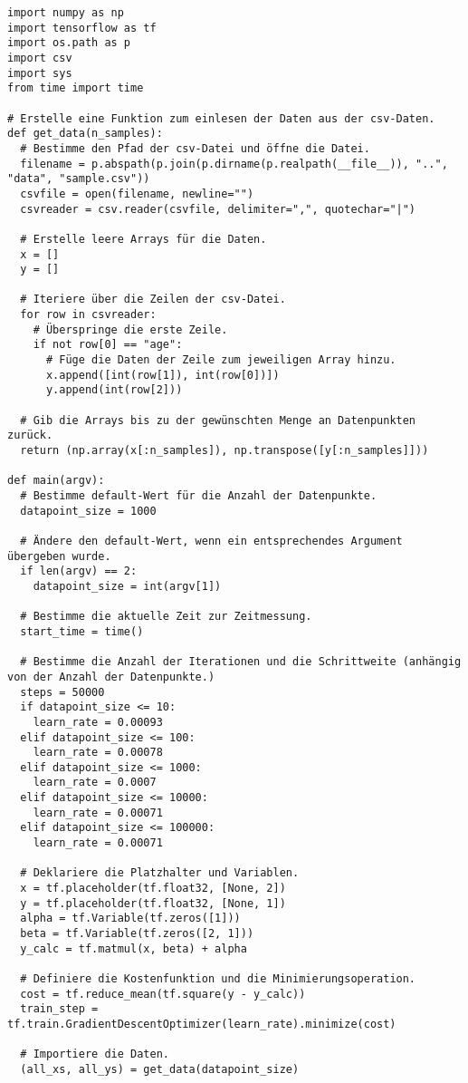 \begin{verbatim}
import numpy as np
import tensorflow as tf
import os.path as p
import csv
import sys
from time import time

# Erstelle eine Funktion zum einlesen der Daten aus der csv-Daten.
def get_data(n_samples):
  # Bestimme den Pfad der csv-Datei und öffne die Datei.
  filename = p.abspath(p.join(p.dirname(p.realpath(__file__)), "..", "data", "sample.csv"))
  csvfile = open(filename, newline="")
  csvreader = csv.reader(csvfile, delimiter=",", quotechar="|")

  # Erstelle leere Arrays für die Daten.
  x = []
  y = []

  # Iteriere über die Zeilen der csv-Datei.
  for row in csvreader:
    # Überspringe die erste Zeile.
    if not row[0] == "age":
      # Füge die Daten der Zeile zum jeweiligen Array hinzu.
      x.append([int(row[1]), int(row[0])])
      y.append(int(row[2]))

  # Gib die Arrays bis zu der gewünschten Menge an Datenpunkten zurück.
  return (np.array(x[:n_samples]), np.transpose([y[:n_samples]]))

def main(argv):
  # Bestimme default-Wert für die Anzahl der Datenpunkte.
  datapoint_size = 1000

  # Ändere den default-Wert, wenn ein entsprechendes Argument übergeben wurde.
  if len(argv) == 2:
    datapoint_size = int(argv[1])

  # Bestimme die aktuelle Zeit zur Zeitmessung.
  start_time = time()

  # Bestimme die Anzahl der Iterationen und die Schrittweite (anhängig von der Anzahl der Datenpunkte.)
  steps = 50000
  if datapoint_size <= 10:
    learn_rate = 0.00093
  elif datapoint_size <= 100:
    learn_rate = 0.00078
  elif datapoint_size <= 1000:
    learn_rate = 0.0007
  elif datapoint_size <= 10000:
    learn_rate = 0.00071
  elif datapoint_size <= 100000:
    learn_rate = 0.00071

  # Deklariere die Platzhalter und Variablen.
  x = tf.placeholder(tf.float32, [None, 2])
  y = tf.placeholder(tf.float32, [None, 1])
  alpha = tf.Variable(tf.zeros([1]))
  beta = tf.Variable(tf.zeros([2, 1]))
  y_calc = tf.matmul(x, beta) + alpha

  # Definiere die Kostenfunktion und die Minimierungsoperation.
  cost = tf.reduce_mean(tf.square(y - y_calc))
  train_step = tf.train.GradientDescentOptimizer(learn_rate).minimize(cost)

  # Importiere die Daten.
  (all_xs, all_ys) = get_data(datapoint_size)


\end{verbatim}
